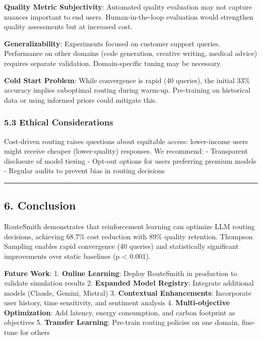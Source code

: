 \documentclass[
]{article}
\begin{document}
\textbf{Quality Metric Subjectivity}: Automated quality evaluation may
not capture nuances important to end users. Human-in-the-loop evaluation
would strengthen quality assessments but at increased cost.

\textbf{Generalizability}: Experiments focused on customer support
queries. Performance on other domains (code generation, creative
writing, medical advice) requires separate validation. Domain-specific
tuning may be necessary.

\textbf{Cold Start Problem}: While convergence is rapid (40 queries),
the initial 33\% accuracy implies suboptimal routing during warm-up.
Pre-training on historical data or using informed priors could mitigate
this.

\hypertarget{ethical-considerations}{%
\subsubsection{5.3 Ethical
Considerations}\label{ethical-considerations}}

Cost-driven routing raises questions about equitable access:
lower-income users might receive cheaper (lower-quality) responses. We
recommend: - Transparent disclosure of model tiering - Opt-out options
for users preferring premium models - Regular audits to prevent bias in
routing decisions

\begin{center}\rule{0.5\linewidth}{0.5pt}\end{center}

\hypertarget{conclusion}{%
\subsection{6. Conclusion}\label{conclusion}}

RouteSmith demonstrates that reinforcement learning can optimize LLM
routing decisions, achieving 68.7\% cost reduction with 89\% quality
retention. Thompson Sampling enables rapid convergence (40 queries) and
statistically significant improvements over static baselines (p
\textless{} 0.001).

\textbf{Future Work}: 1. \textbf{Online Learning}: Deploy RouteSmith in
production to validate simulation results 2. \textbf{Expanded Model
Registry}: Integrate additional models (Claude, Gemini, Mistral) 3.
\textbf{Contextual Enhancements}: Incorporate user history, time
sensitivity, and sentiment analysis 4. \textbf{Multi-objective
Optimization}: Add latency, energy consumption, and carbon footprint as
objectives 5. \textbf{Transfer Learning}: Pre-train routing policies on
one domain, fine-tune for others
\end{document}
